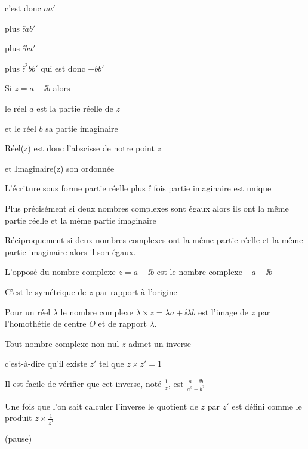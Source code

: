 c'est donc $aa'$

plus $\ii a b'$

plus $\ii ba'$

plus $\ii^2 bb'$ qui est donc $-bb'$


\diapo

Si $z = a+ \ii b$ 
alors

le réel $a$ est la partie réelle de $z$

et le réel $b$ sa partie imaginaire

\change

Réel(z) est donc l'abscisse de notre point $z$

et Imaginaire(z) son ordonnée

\change

L'écriture sous forme partie réelle 
plus $\ii$ fois partie imaginaire est unique

Plus précisément si deux nombres complexes sont égaux
alors ils ont la même partie réelle et la même partie imaginaire

Réciproquement si deux nombres complexes ont la même partie réelle et la même partie imaginaire
alors il son égaux.



\diapo

L'opposé du nombre complexe $z=a+\ii b$ est le nombre complexe $-a - \ii b$

C'est le symétrique de $z$ par rapport à l'origine

Pour un réel $\lambda$  le nombre complexe $\lambda \times z= \lambda a + \ii \lambda b$
est l'image de $z$ par l'homothétie de centre $O$
et de rapport $\lambda$.

\diapo

Tout nombre complexe non nul $z$ admet un inverse

c'est-à-dire qu'il existe $z'$ tel que $z \times z' =1$

\change

Il est facile de vérifier que cet inverse, noté $\frac 1 z$,
est $\frac{a - \ii b}{a^2 + b^2}$

\change

Une fois que l'on sait calculer l'inverse
le quotient de $z$ par $z'$ est défini comme le produit $z \times \frac 1 {z'}$

(pause)

\change


